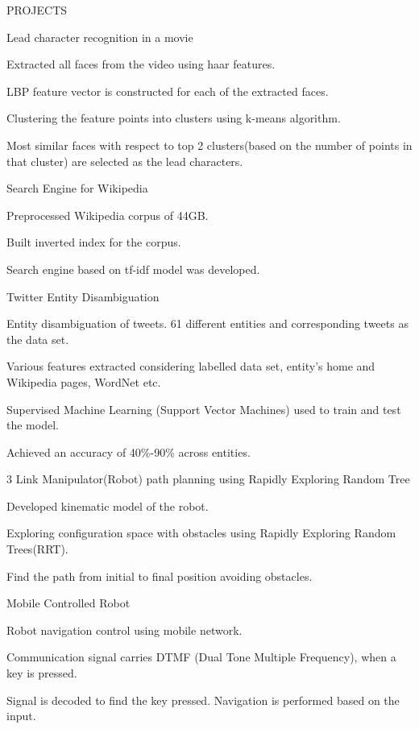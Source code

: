 \documentclass{resume} %
\begin{document}
\begin{rSection}{PROJECTS}
\begin{rSubsection}{Lead character recognition in a movie}{}{}{}
\item Extracted all faces from the video using haar features.
\item LBP feature vector is constructed for each of the extracted faces.
\item Clustering the feature points into clusters using k-means algorithm.
\item Most similar faces with respect to top 2 clusters(based on the number of points in that cluster) are selected as the lead characters.
\end{rSubsection}

\begin{rSubsection}{Search Engine for Wikipedia}{}{}{}
\item Preprocessed Wikipedia corpus of 44GB. 
\item Built inverted index for the corpus.
\item Search engine based on tf-idf model was developed.
\end{rSubsection}

\begin{rSubsection}{Twitter Entity Disambiguation}{}{}{}
\item Entity disambiguation of tweets. 61 different entities and corresponding tweets as the data set.  
\item Various features extracted considering labelled data set, entity’s home and Wikipedia pages, WordNet etc.
\item Supervised Machine Learning (Support Vector Machines) used to train and test the model.
\item Achieved an accuracy of 40\%-90\% across entities.
\end{rSubsection}

\begin{rSubsection}{3 Link Manipulator(Robot) path planning using Rapidly Exploring Random Tree}{}{}{}
\item Developed kinematic model of the robot. 
\item Exploring configuration space with obstacles using Rapidly Exploring Random Trees(RRT).
\item Find the path from initial to final position avoiding obstacles. 
\end{rSubsection}

\begin{rSubsection}{Mobile Controlled Robot}{}{}{}
\item Robot navigation control using mobile network.  
\item Communication signal carries DTMF (Dual Tone Multiple Frequency), when a key is pressed.
\item Signal is decoded to find the key pressed. Navigation is performed based on the input.
\end{rSubsection}

\end{rSection}
\end{document}
